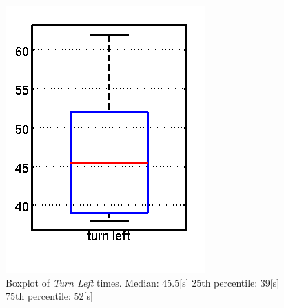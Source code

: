 \begin{figure}
\centering
{}
\includegraphics[width=\textwidth]{Files/Figures/box_turn_left.png}
\caption[Box plot of turn left]{Boxplot of \newline \textit{Turn Left} times. \newline
Median: 45.5[s]\newline
25th percentile: 39[s]\newline
75th percentile: 52[s]}
\label{fig:box_turn_left}
\endminipage\hfill
{}

\end{figure}
